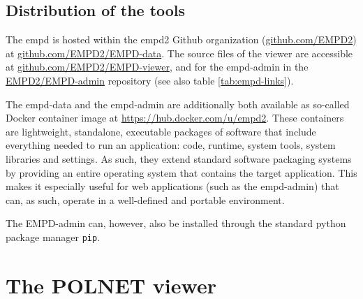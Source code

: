 \begin{refsection}
\subsection{Distribution of the tools}\label{sec:empd-accessibility}

The \gls{empd} is hosted within the \gls{empd}2 Github organization (\href{https://github.com/EMPD2}{github.com/EMPD2}) at \href{https://github.com/EMPD2/EMPD-data}{{github.com/EMPD2/EMPD-data}}. The source files of the viewer are accessible at
\href{https://github.com/EMPD2/EMPD-viewer}{{github.com/EMPD2/EMPD-viewer}}, and for the \gls{empd}-admin in the {\href{https://github.com/EMPD2/EMPD-admin}{{EMPD2/EMPD-admin}}} repository (see also table \ref{tab:empd-links}).

The \gls{empd}-data and the \gls{empd}-admin are additionally both available as so-called Docker container image at \url{https://hub.docker.com/u/empd2}. These containers are lightweight, standalone, executable packages of software that include everything needed to run an application: code, runtime, system tools, system libraries and settings. As such, they extend standard software packaging systems by providing an entire operating system that contains the target application. This makes it especially useful for web applications (such as the \gls{empd}-admin) that can, as such, operate in a well-defined and portable environment.

The EMPD-admin can, however, also be installed through the standard python package manager \texttt{pip}.

\section{The POLNET viewer} \label{sec:polnet-viewer}


\end{refsection}
